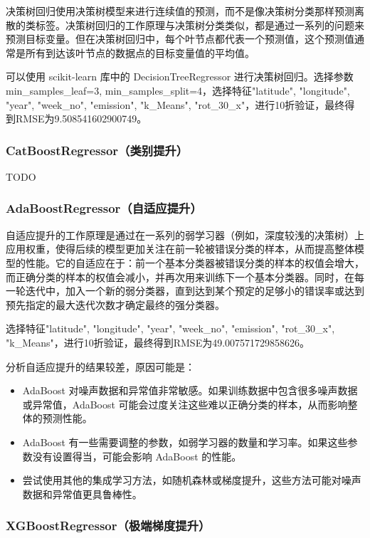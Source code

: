\documentclass{ctexart}
\begin{document}
决策树回归使用决策树模型来进行连续值的预测，而不是像决策树分类那样预测离散的类标签。决策树回归的工作原理与决策树分类类似，都是通过一系列的问题来预测目标变量。但在决策树回归中，每个叶节点都代表一个预测值，这个预测值通常是所有到达该叶节点的数据点的目标变量值的平均值。

可以使用 scikit-learn 库中的 DecisionTreeRegressor 进行决策树回归。选择参数min\_samples\_leaf=3, min\_samples\_split=4，选择特征"latitude", "longitude", "year", "week\_no", "emission", "k\_Means", "rot\_30\_x"，进行10折验证，最终得到RMSE为9.508541602900749。

\subsubsection{CatBoostRegressor（类别提升）}

TODO

\subsubsection{AdaBoostRegressor（自适应提升）}

自适应提升的工作原理是通过在一系列的弱学习器（例如，深度较浅的决策树）上应用权重，使得后续的模型更加关注在前一轮被错误分类的样本，从而提高整体模型的性能。它的自适应在于：前一个基本分类器被错误分类的样本的权值会增大，而正确分类的样本的权值会减小，并再次用来训练下一个基本分类器。同时，在每一轮迭代中，加入一个新的弱分类器，直到达到某个预定的足够小的错误率或达到预先指定的最大迭代次数才确定最终的强分类器。

选择特征"latitude", "longitude", "year", "week\_no", "emission", "rot\_30\_x", "k\_Means"，进行10折验证，最终得到RMSE为49.007571729858626。

分析自适应提升的结果较差，原因可能是：

\begin{itemize}
      \item AdaBoost 对噪声数据和异常值非常敏感。如果训练数据中包含很多噪声数据或异常值，AdaBoost 可能会过度关注这些难以正确分类的样本，从而影响整体的预测性能。
      \item AdaBoost 有一些需要调整的参数，如弱学习器的数量和学习率。如果这些参数没有设置得当，可能会影响 AdaBoost 的性能。
      \item 尝试使用其他的集成学习方法，如随机森林或梯度提升，这些方法可能对噪声数据和异常值更具鲁棒性。
\end{itemize}

\subsubsection{XGBoostRegressor（极端梯度提升）}
\end{document}
